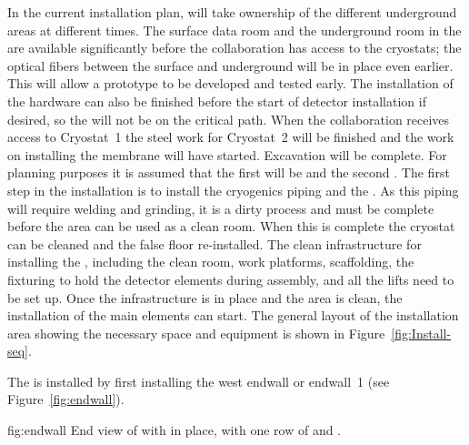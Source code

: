In the current installation plan,  will take
ownership of the different underground areas at different times. The
surface data room and the underground room in the  are available
significantly before the collaboration has access to the cryostats; 
the optical fibers between the surface and underground will be in
place even earlier. This will allow a  prototype to be developed
and tested early. The installation of the  hardware can also be
finished before the start of detector installation if desired, so the
 will not be on the critical path.  When the collaboration receives
access to Cryostat~1 the steel work for Cryostat~2 will be
finished and the work on installing the membrane will have
started. Excavation will be complete.  For planning purposes it is
assumed that the first  will be  and the second
. The first step in the  installation is to
install the cryogenics piping and the . As this piping will
require welding and grinding, it is a dirty process and must be
complete before the area can be used as a clean room. When this is
complete the cryostat can be cleaned and the false floor
re-installed. The clean infrastructure for installing the ,
including the clean room, work platforms, scaffolding, the
fixturing to hold the detector elements during assembly, and all the
lifts need to be set up. Once the infrastructure is in place and the
area is clean, the installation of the main elements can start. The
general layout of the installation area showing the necessary space
and equipment is shown in Figure~\ref{fig:Install-seq}. 

The   is installed by first installing the west endwall or
endwall~1 (see Figure~\ref{fig:endwall}).

\begin{dunefigure}{fig:endwall}
  {End view of  with  in
  place, with one row of  and .}
\end{dunefigure}

